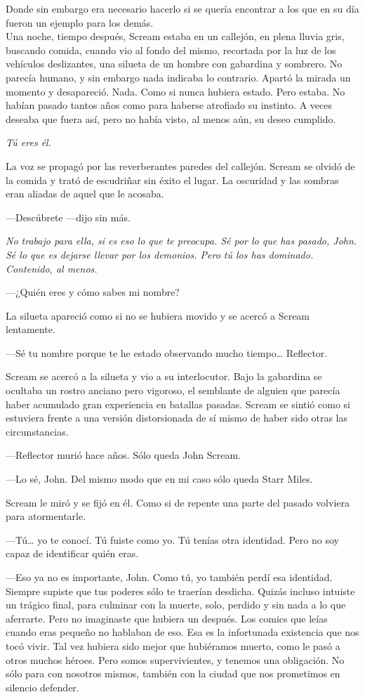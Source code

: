 Donde sin embargo era necesario hacerlo si se quería encontrar a los que en su día fueron un ejemplo para los demás.\\

\noindent{}Una noche, tiempo después, Scream estaba en un callejón, en plena lluvia gris, buscando comida, cuando vio al fondo del mismo, recortada por la luz de los vehículos deslizantes, una silueta de un hombre con gabardina y sombrero. No parecía humano, y sin embargo nada indicaba lo contrario. Apartó la mirada un momento y desapareció. Nada. Como si nunca hubiera estado. Pero estaba. No habían pasado tantos años como para haberse atrofiado su instinto. A veces deseaba que fuera así, pero no había visto, al menos aún, su deseo cumplido.

\emph{Tú eres él.}

La voz se propagó por las reverberantes paredes del callejón. Scream se olvidó de la comida y trató de escudriñar sin éxito el lugar. La oscuridad y las sombras eran aliadas de aquel que le acosaba.

---Descúbrete ---dijo sin más.

\emph{No trabajo para ella, si es eso lo que te preocupa. Sé por lo que has pasado, John. Sé lo que es dejarse llevar por los demonios. Pero tú los has dominado. Contenido, al menos.}

---¿Quién eres y cómo sabes mi nombre?

La silueta apareció como si no se hubiera movido y se acercó a Scream lentamente.

---Sé tu nombre porque te he estado observando mucho tiempo\dots{} Reflector.

Scream se acercó a la silueta y vio a su interlocutor. Bajo la gabardina se ocultaba un rostro anciano pero vigoroso, el semblante de alguien que parecía haber acumulado gran experiencia en batallas pasadas. Scream se sintió como si estuviera frente a una versión distorsionada de sí mismo de haber sido otras las circunstancias.

---Reflector murió hace años. Sólo queda John Scream.

---Lo sé, John. Del mismo modo que en mi caso sólo queda Starr Miles.

Scream le miró y se fijó en él. Como si de repente una parte del pasado volviera para atormentarle.

---Tú\dots{} yo te conocí. Tú fuiste como yo. Tú tenías otra identidad. Pero no soy capaz de identificar quién eras.

---Eso ya no es importante, John. Como tú, yo también perdí esa identidad. Siempre supiste que tus poderes sólo te traerían desdicha. Quizás incluso intuiste un trágico final, para culminar con la muerte, solo, perdido y sin nada a lo que aferrarte. Pero no imaginaste que hubiera un después. Los comics que leías cuando eras pequeño no hablaban de eso. Esa es la infortunada existencia que nos tocó vivir. Tal vez hubiera sido mejor que hubiéramos muerto, como le pasó a otros muchos héroes. Pero somos supervivientes, y tenemos una obligación. No sólo para con nosotros mismos, también con la ciudad que nos prometimos en silencio defender.

